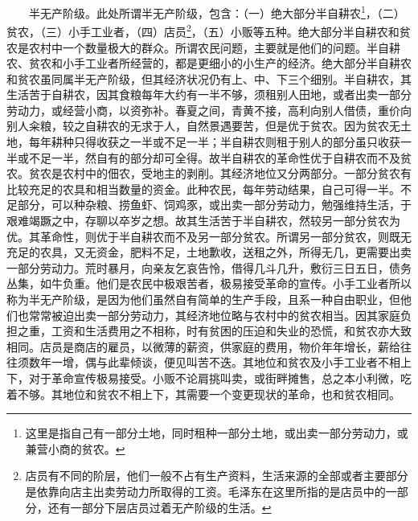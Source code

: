 \documentclass[cn,11pt,chinese]{elegantbook}
\begin{document}
　　半无产阶级。此处所谓半无产阶级，包含：（一）绝大部分半自耕农\footnote[10]{ 这里是指自己有一部分土地，同时租种一部分土地，或出卖一部分劳动力，或兼营小商的贫农。}，（二）贫农，（三）小手工业者，（四）店员\footnote[11]{ 店员有不同的阶层，他们一般不占有生产资料，生活来源的全部或者主要部分是依靠向店主出卖劳动力所取得的工资。毛泽东在这里所指的是店员中的一部分，还有一部分下层店员过着无产阶级的生活。}，（五）小贩等五种。绝大部分半自耕农和贫农是农村中一个数量极大的群众。所谓农民问题，主要就是他们的问题。半自耕农、贫农和小手工业者所经营的，都是更细小的小生产的经济。绝大部分半自耕农和贫农虽同属半无产阶级，但其经济状况仍有上、中、下三个细别。半自耕农，其生活苦于自耕农，因其食粮每年大约有一半不够，须租别人田地，或者出卖一部分劳动力，或经营小商，以资弥补。春夏之间，青黄不接，高利向别人借债，重价向别人籴粮，较之自耕农的无求于人，自然景遇要苦，但是优于贫农。因为贫农无土地，每年耕种只得收获之一半或不足一半；半自耕农则租于别人的部分虽只收获一半或不足一半，然自有的部分却可全得。故半自耕农的革命性优于自耕农而不及贫农。贫农是农村中的佃农，受地主的剥削。其经济地位又分两部分。一部分贫农有比较充足的农具和相当数量的资金。此种农民，每年劳动结果，自己可得一半。不足部分，可以种杂粮、捞鱼虾、饲鸡豕，或出卖一部分劳动力，勉强维持生活，于艰难竭蹶之中，存聊以卒岁之想。故其生活苦于半自耕农，然较另一部分贫农为优。其革命性，则优于半自耕农而不及另一部分贫农。所谓另一部分贫农，则既无充足的农具，又无资金，肥料不足，土地歉收，送租之外，所得无几，更需要出卖一部分劳动力。荒时暴月，向亲友乞哀告怜，借得几斗几升，敷衍三日五日，债务丛集，如牛负重。他们是农民中极艰苦者，极易接受革命的宣传。小手工业者所以称为半无产阶级，是因为他们虽然自有简单的生产手段，且系一种自由职业，但他们也常常被迫出卖一部分劳动力，其经济地位略与农村中的贫农相当。因其家庭负担之重，工资和生活费用之不相称，时有贫困的压迫和失业的恐慌，和贫农亦大致相同。店员是商店的雇员，以微薄的薪资，供家庭的费用，物价年年增长，薪给往往须数年一增，偶与此辈倾谈，便见叫苦不迭。其地位和贫农及小手工业者不相上下，对于革命宣传极易接受。小贩不论肩挑叫卖，或街畔摊售，总之本小利微，吃着不够。其地位和贫农不相上下，其需要一个变更现状的革命，也和贫农相同。\\
\end{document}
